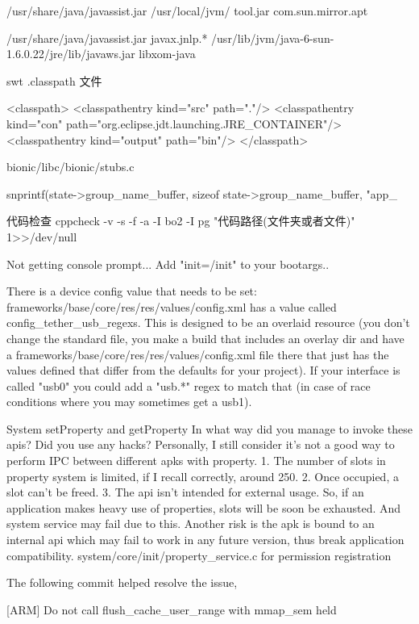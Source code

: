 \documentclass{book}
\begin{document}
\begin{CJK}{UTF8}{gbsn}
{{{{{/usr/share/java/javassist.jar
/usr/local/jvm/  tool.jar    com.sun.mirror.apt 

/usr/share/java/javassist.jar
javax.jnlp.*       /usr/lib/jvm/java-6-sun-1.6.0.22/jre/lib/javaws.jar
libxom-java

swt   
.classpath 文件

<classpath>
        <classpathentry kind="src" path="."/>
        <classpathentry kind="con" path="org.eclipse.jdt.launching.JRE_CONTAINER"/>
	<classpathentry kind="output" path="bin"/>
</classpath>

 bionic/libc/bionic/stubs.c   

    snprintf(state->group_name_buffer, sizeof state->group_name_buffer,
             "app_%

代码检查
cppcheck -v -s -f -a -I bo2 -I pg "代码路径(文件夹或者文件)"  1>>/dev/null

Not getting console prompt...
Add "init=/init" to your bootargs..


There is a device config value that needs to be set:
frameworks/base/core/res/res/values/config.xml has a value called
config_tether_usb_regexs.  This is designed to be an overlaid resource
(you don't change the standard file, you make a build that includes an
overlay dir and have a frameworks/base/core/res/res/values/config.xml file
there that just has the values defined that differ from the defaults for
your project).  If your interface is called "usb0" you could add a "usb.*"
regex to match that (in case of race conditions where you may sometimes get
a usb1).

System setProperty and getProperty
In what way did you manage to invoke these apis? Did you use any hacks?
Personally, I still consider it's not a good way to perform IPC between different apks with property.
1. The number of slots in property system is limited, if I recall correctly, around 250.
2. Once occupied, a slot can't be freed.
3. The api isn't intended for external usage.
So, if an application makes heavy use of properties, slots will be soon be exhausted. And system service may fail due to this. Another risk is the apk is bound to an internal api which may fail to work in any future version, thus break application compatibility.
system/core/init/property_service.c for
permission registration


        
   The following commit helped resolve the issue,

[ARM] Do not call flush_cache_user_range with mmap_sem held

}}}}}
\end{CJK}
\end{document}
